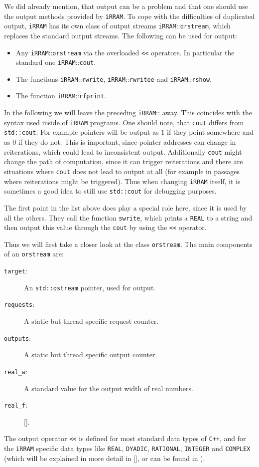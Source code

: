 \documentclass{article}
\newcommand{\irram}{\texttt{iRRAM}\xspace}
\newcommand{\cc}{\texttt{C++}\xspace}
\newcommand{\ir}[1]{\texttt{#1}}
\newcommand{\code}[1]{\texttt{#1}}
\begin{document}
We did already mention, that output can be a problem and that one should use the output methods provided by \irram. To cope with the difficulties of duplicated output, \irram has its own class of output streams \irram::\ir{orstream}, which replaces the standard output streams. The following can be used for output:
\begin{itemize}
\item Any \irram::\ir{orstream} via the overloaded \ir{<<} operators. In particular the standard one \irram::\ir{cout}.
\item The functions \irram::\ir{rwrite}, \irram::\ir{rwritee} and \irram::\ir{rshow}.
\item The function \irram::\ir{rfprint}.
\end{itemize}
In the following we will leave the preceding \irram::\ir{} away. This coincides with the syntax used inside of \irram programs. One should note, that \ir{cout} differs from \code{std::cout}: For example pointers will be output as $1$ if they point somewhere and as $0$ if they do not. This is important, since pointer addresses can change in reiterations, which could lead to inconsistent output. Additionally \ir{cout} might change the path of computation, since it can trigger reiterations and there are situations where \ir{cout} does not lead to output at all (for example in passages where reiterations might be triggered). Thus when changing \irram itself, it is sometimes a good idea to still use \code{std::cout} for debugging purposes.

The first point in the list above does play a special role here, since it is used by all the others. They call the function \ir{swrite}, which prints a \ir{REAL} to a string and then output this value through the \ir{cout} by using the \ir{<<} operator.

Thus we will first take a closer look at the class \ir{orstream}. The main components of an \ir{orstream} are:
\begin{description}
\item[\code{target}:] An \code{std::ostream} pointer, used for output.
\item[\code{requests}:] A static but thread specific request counter.
\item[\code{outputs}:] A static but thread specific output counter.
\item[\code{real\_w}:] A standard value for the output width of real numbers.
\item[\code{real\_f}:] \ref{}.
\end{description}
The output operator \code{<<} is defined for most standard data types of \cc, and for the \irram specific data types like \ir{REAL}, \ir{DYADIC}, \ir{RATIONAL}, \ir{INTEGER} and \ir{COMPLEX} (which will be explained in more detail in \cref{}, or can be found in \cite{}).
\end{document}
